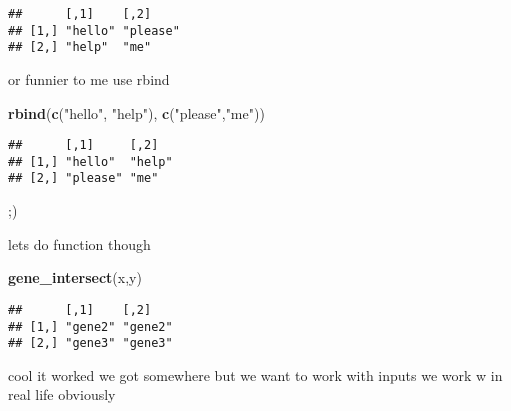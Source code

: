 \documentclass[]{article}
\newenvironment{Shaded}{\begin{snugshade}}{\end{snugshade}}
\newcommand{\KeywordTok}[1]{\textcolor[rgb]{0.13,0.29,0.53}{\textbf{#1}}}
\newcommand{\StringTok}[1]{\textcolor[rgb]{0.31,0.60,0.02}{#1}}
\newcommand{\ControlFlowTok}[1]{\textcolor[rgb]{0.13,0.29,0.53}{\textbf{#1}}}
\newcommand{\OperatorTok}[1]{\textcolor[rgb]{0.81,0.36,0.00}{\textbf{#1}}}
\newcommand{\NormalTok}[1]{#1}
\begin{document}
\begin{verbatim}
##      [,1]    [,2]    
## [1,] "hello" "please"
## [2,] "help"  "me"
\end{verbatim}

or funnier to me use rbind

\begin{Shaded}
\begin{Highlighting}[]
\KeywordTok{rbind}\NormalTok{(}\KeywordTok{c}\NormalTok{(}\StringTok{"hello"}\NormalTok{, }\StringTok{"help"}\NormalTok{), }\KeywordTok{c}\NormalTok{(}\StringTok{"please"}\NormalTok{,}\StringTok{"me"}\NormalTok{))}
\end{Highlighting}
\end{Shaded}

\begin{verbatim}
##      [,1]     [,2]  
## [1,] "hello"  "help"
## [2,] "please" "me"
\end{verbatim}

;)

lets do function though

\begin{Shaded}
\end{Shaded}

\begin{Shaded}
\begin{Highlighting}[]
\KeywordTok{gene_intersect}\NormalTok{(x,y)}
\end{Highlighting}
\end{Shaded}

\begin{verbatim}
##      [,1]    [,2]   
## [1,] "gene2" "gene2"
## [2,] "gene3" "gene3"
\end{verbatim}

cool it worked we got somewhere but we want to work with inputs we work
w in real life obviously

\begin{Shaded}
\end{Shaded}
\end{document}
